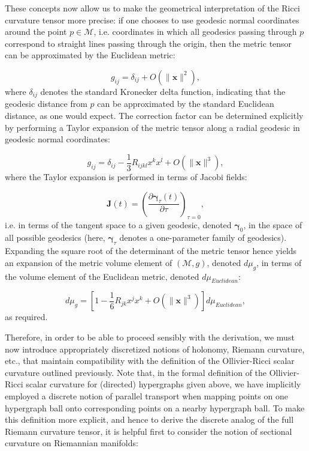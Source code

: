 \documentclass{article}
\begin{document}
These concepts now allow us to make the geometrical interpretation of the Ricci curvature tensor more precise: if one chooses to use geodesic normal coordinates around the point ${p \in \mathcal{M}}$, i.e. coordinates in which all geodesics passing through $p$ correspond to straight lines passing through the origin, then the metric tensor can be approximated by the Euclidean metric:

\begin{equation}
g_{i j} = \delta_{i j} + O \left( \lVert \mathbf{x} \rVert^2 \right),
\end{equation}
where ${\delta_{i j}}$ denotes the standard Kronecker delta function, indicating that the geodesic distance from $p$ can be approximated by the standard Euclidean distance, as one would expect. The correction factor can be determined explicitly by performing a Taylor expansion of the metric tensor along a radial geodesic in geodesic normal coordinates:

\begin{equation}
g_{i j} = \delta_{i j} - \frac{1}{3} R_{i j k l} x^k x^l + O \left( \lVert \mathbf{x} \rVert^3 \right),
\end{equation}
where the Taylor expansion is performed in terms of Jacobi fields:

\begin{equation}
\mathbf{J} \left( t \right) = \left( \frac{\partial \boldsymbol\gamma_{\tau} \left( t \right)}{\partial \tau} \right)_{\tau = 0},
\end{equation}
i.e. in terms of the tangent space to a given geodesic, denoted ${\boldsymbol\gamma_0}$, in the space of all possible geodesics (here, ${\boldsymbol\gamma_{\tau}}$ denotes a one-parameter family of geodesics). Expanding the square root of the determinant of the metric tensor hence yields an expansion of the metric volume element of ${\left( \mathcal{M}, g \right)}$, denoted ${d \mu_g}$, in terms of the volume element of the Euclidean metric, denoted ${d \mu_{Euclidean}}$:

\begin{equation}
d \mu_g = \left[ 1 - \frac{1}{6} R_{j k} x^j x^k + O \left( \lVert \mathbf{x} \rVert^3 \right) \right] d \mu_{Euclidean},
\end{equation}
as required.

Therefore, in order to be able to proceed sensibly with the derivation, we must now introduce appropriately discretized notions of holonomy, Riemann curvature, etc., that maintain compatibility with the definition of the Ollivier-Ricci scalar curvature outlined previously. Note that, in the formal definition of the Ollivier-Ricci scalar curvature for (directed) hypergraphs given above, we have implicitly employed a discrete notion of parallel transport when mapping points on one hypergraph ball onto corresponding points on a nearby hypergraph ball. To make this definition more explicit, and hence to derive the discrete analog of the full Riemann curvature tensor, it is helpful first to consider the notion of sectional curvature on Riemannian manifolds:
\end{document}
